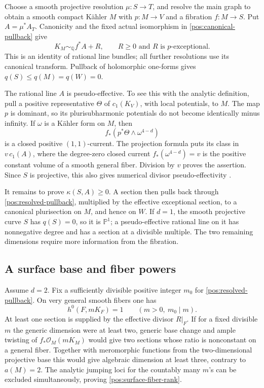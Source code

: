 \documentclass[11pt,letterpaper]{article}
\theoremstyle{definition}
\theoremstyle{remark}
\begin{document}
Choose a smooth projective resolution \(\mu:S\to T\), and resolve
the main graph to obtain a smooth compact Kähler \(M\) with
\(p:M\to V\) and a fibration \(f:M\to S\). Put \(A=\mu^*A_T\).
Canonicity and the fixed actual isomorphism in
\eqref{pos:canonical-pullback} give
\begin{equation}\label{pos:resolved-pullback}
 K_M\sim_{\mathbb{Q}}f^*A+R,
 \qquad R\geq0\text{ and }R\text{ is }p\text{-exceptional}.
\end{equation}
This is an identity of rational line bundles; all further resolutions
use its canonical transform. Pullback of holomorphic one-forms gives
\(q(S)\leq q(M)=q(W)=0\).

The rational line \(A\) is pseudo-effective. To see this with the
analytic definition, pull a positive representative \(\Theta\) of
\(c_1(K_V)\), with local potentials, to \(M\). The map \(p\) is
dominant, so its plurisubharmonic potentials do not become identically
minus infinity. If \(\omega\) is a Kähler form on \(M\), then
\[
 f_*(p^*\Theta\wedge\omega^{4-d})
\]
is a closed positive \((1,1)\)-current. The projection formula puts its
class in \(v\,c_1(A)\), where the degree-zero closed current
\(f_*(\omega^{4-d})=v\) is the positive constant volume of a smooth
general fiber. Division by \(v\) proves the assertion. Since \(S\)
is projective, this also gives numerical divisor pseudo-effectivity
\cite{BDPP}.

It remains to prove \(\kappa(S,A)\geq0\). A section then pulls back
through \eqref{pos:resolved-pullback}, multiplied by the effective
exceptional section, to a canonical plurisection on \(M\), and hence
on \(W\). If \(d=1\), the smooth projective curve \(S\) has
\(q(S)=0\), so it is \(\mathbb{P}^1\); a pseudo-effective rational line on
it has nonnegative degree and has a section at a divisible multiple.
The two remaining dimensions require more information from the
fibration.

\subsection{A surface base and fiber powers}

Assume \(d=2\). Fix a sufficiently divisible positive integer \(m_0\)
for \eqref{pos:resolved-pullback}. On very general smooth fibers one
has
\begin{equation}\label{pos:surface-fiber-rank}
 h^0(F,mK_F)=1\qquad(m>0,\ m_0\mid m).
\end{equation}
At least one section is supplied by the effective divisor \(R|_F\).
If for a fixed divisible \(m\) the generic dimension were at least
two, generic base change and ample twisting of
\(f_*\mathcal{O}_M(mK_M)\) would give two sections whose ratio is nonconstant
on a general fiber. Together with meromorphic functions from the
two-dimensional projective base this would give algebraic dimension
at least three, contrary to \(a(M)=2\). The analytic jumping loci
for the countably many \(m\)'s can be excluded simultaneously, proving
\eqref{pos:surface-fiber-rank}.
\end{document}
